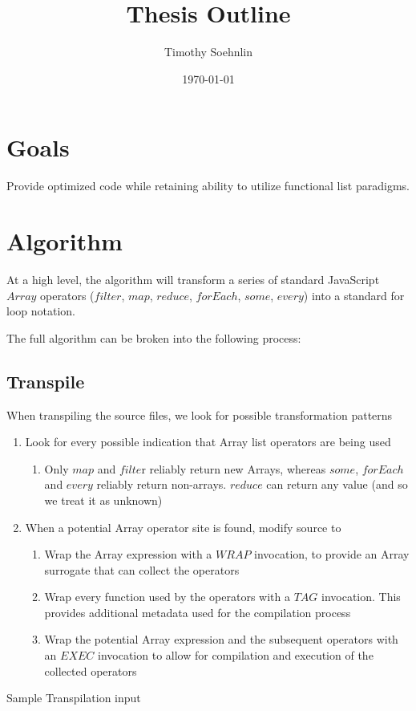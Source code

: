 \documentclass{article}
\title{Thesis Outline}
\author{Timothy Soehnlin}
\date{\today}
\begin{document}
\section{Goals}
Provide optimized code while retaining ability to utilize functional list paradigms.

\section{Algorithm}
At a high level, the algorithm will transform a series of standard JavaScript $Array$ operators ($filter$, $map$, 
$reduce$, $forEach$, $some$, $every$) into a standard for loop notation.  

The full algorithm can be broken into the following process:

\subsection{Transpile}
When transpiling the source files, we look for possible transformation patterns
  \begin{enumerate}
    \item Look for every possible indication that Array list operators are being used
    \begin{enumerate}
      \item Only $map$ and $filte$r reliably return new Arrays, whereas $some$, 
        $forEach$ and $every$ reliably return non-arrays.  $reduce$ can return 
        any value (and so we treat it as unknown)    
    \end{enumerate}
    \item When a potential Array operator site is found, modify source to
    \begin{enumerate} 
      \item	Wrap the Array expression with a $WRAP$ invocation, to provide an Array surrogate that can collect the operators
      \item	Wrap every function used by the operators with a $TAG$ invocation.  This provides additional metadata used for the compilation process
      \item	Wrap the potential Array expression and the subsequent operators with an $EXEC$ invocation to allow for compilation and execution of the collected operators
    \end{enumerate}    
  \end{enumerate}

  Sample Transpilation input  
  
\end{document}
